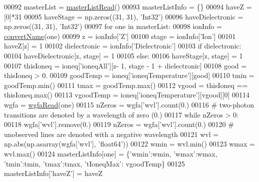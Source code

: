\begin{DoxyCode}
{00092         masterList = \hyperlink{namespacepyneb_1_1utils_1_1__chianti__tools_ab11f940d11d2b1118ffb581a39d7e42a}{masterListRead}()
00093         masterListInfo = \{\}
00094         haveZ = [0]*31
00095         haveStage = np.zeros((31, 31), \textcolor{stringliteral}{'Int32'})
00096         haveDielectronic = np.zeros((31, 31), \textcolor{stringliteral}{'Int32'})
00097         \textcolor{keywordflow}{for} one \textcolor{keywordflow}{in} masterList:
00098             ionInfo = \hyperlink{namespacepyneb_1_1utils_1_1__chianti__tools_a8038874902563556b0a8b536f52d3194}{convertName}(one)
00099             z = ionInfo[\textcolor{stringliteral}{'Z'}]
00100             stage = ionInfo[\textcolor{stringliteral}{'Ion'}]
00101             haveZ[z] = 1
00102             dielectronic = ionInfo[\textcolor{stringliteral}{'Dielectronic'}]
00103             \textcolor{keywordflow}{if} dielectronic:
00104                 haveDielectronic[z, stage] = 1
00105             \textcolor{keywordflow}{else}:
00106                 haveStage[z, stage] = 1
00107             thisIoneq = ioneq[\textcolor{stringliteral}{'ioneqAll'}][z- 1, stage - 1 + dielectronic]
00108             good = thisIoneq > 0.
00109             goodTemp = ioneq[\textcolor{stringliteral}{'ioneqTemperature'}][good]
00110             tmin = goodTemp.min()
00111             tmax = goodTemp.max()
00112             vgood = thisIoneq == thisIoneq.max()
00113             vgoodTemp = ioneq[\textcolor{stringliteral}{'ioneqTemperature'}][vgood][0]
00114             wgfa = \hyperlink{namespacepyneb_1_1utils_1_1__chianti__tools_a3ef36a1d0a4df4cab94a392d2a3da980}{wgfaRead}(one)
00115             nZeros = wgfa[\textcolor{stringliteral}{'wvl'}].count(0.)
00116             \textcolor{comment}{# two-photon transitions are denoted by a wavelength of zero (0.)}
00117             \textcolor{keywordflow}{while} nZeros > 0:
00118                 wgfa[\textcolor{stringliteral}{'wvl'}].remove(0.)
00119                 nZeros = wgfa[\textcolor{stringliteral}{'wvl'}].count(0.)
00120             \textcolor{comment}{# unobserved lines are denoted with a negative wavelength}
00121             wvl = np.abs(np.asarray(wgfa[\textcolor{stringliteral}{'wvl'}], \textcolor{stringliteral}{'float64'}))
00122             wmin = wvl.min()
00123             wmax = wvl.max()
00124             masterListInfo[one] = \{\textcolor{stringliteral}{'wmin'}:wmin, \textcolor{stringliteral}{'wmax'}:wmax, \textcolor{stringliteral}{'tmin'}:tmin, \textcolor{stringliteral}{'tmax'}:tmax, \textcolor{stringliteral}{'tIoneqMax'}:
      vgoodTemp\}
00125         masterListInfo[\textcolor{stringliteral}{'haveZ'}] = haveZ
}
\end{DoxyCode}
